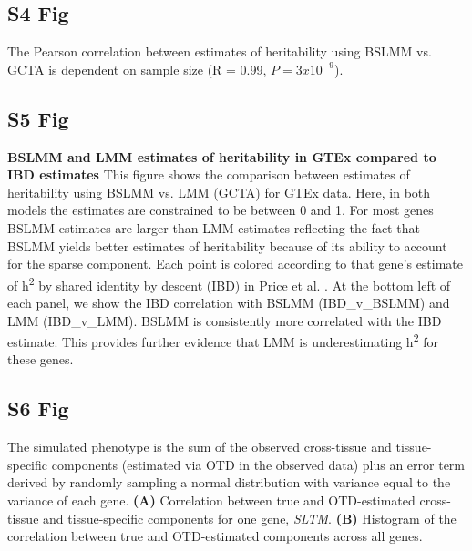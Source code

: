 \documentclass[10pt,letterpaper]{article}
\begin{document}
\begin{singlespace}
\subsection*{S4 Fig}
\label{S4_Fig}

 The Pearson correlation between estimates of heritability using BSLMM vs. GCTA is dependent on sample size (R = 0.99, $P = 3 x 10^{-9}$).

\subsection*{S5 Fig}
\label{S5_Fig}

{\bf BSLMM and LMM estimates of heritability in GTEx compared to IBD estimates} 
This figure shows the comparison between estimates of heritability using BSLMM vs. LMM (GCTA) for GTEx data. Here, in both models the estimates are constrained to be between 0 and 1. For most genes BSLMM estimates are larger than LMM estimates reflecting the fact that BSLMM yields better estimates of heritability because of its ability to account for the sparse component. Each point is colored according to that gene's estimate of h\textsuperscript{2} by shared identity by descent (IBD) in Price et al. \cite{Price_2011}. At the bottom left of each panel, we show the IBD correlation with BSLMM (IBD\_v\_BSLMM) and LMM (IBD\_v\_LMM). BSLMM is consistently more correlated with the IBD estimate. This  provides further evidence that LMM is underestimating h\textsuperscript{2} for these genes.

\subsection*{S6 Fig}
\label{S6_Fig}

 The simulated phenotype is the sum of the observed cross-tissue and tissue-specific components (estimated via OTD in the observed data) plus an error term derived by randomly sampling a normal distribution with variance equal to the variance of each gene. {\bf (A)} Correlation between true and OTD-estimated cross-tissue and tissue-specific components for one gene, \textit{SLTM}.  {\bf(B)} Histogram of the correlation between true and OTD-estimated components across all genes.


\end{singlespace}
\end{document}
